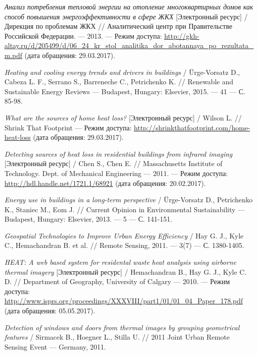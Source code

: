 \begin{thebibliography}{00}
	\emph{Анализ потребления тепловой энергии на отопление многоквартирных домов как способ повышения энергоэффективности в сфере ЖКХ} [Электронный ресурс] / Дирекция по проблемам ЖКХ //
	Аналитический центр при Правительстве Российской Федерации. --- 2013. --- Режим доступа:
	\url{http://gkh-altay.ru/d/205499/d/06_24_kr_stol_analitika_dor_abotannaya_po_rezultata_m.pdf} (дата обращения: 29.03.2017).

	\emph{Heating and cooling energy trends and drivers in buildings} / Ürge-Vorsatz D., Cabeza L. F., Serrano S., Barreneche C., Petrichenko K. //
	Renewable and Sustainable Energy Reviews --- Budapest, Hungary: Elsevier, 2015. --- \No{} 41 --- С. 85-98.

	\emph{What are the sources of home heat loss?} [Электронный ресурс] / Wilson L. //
	Shrink That Footprint --- Режим доступа: \url{http://shrinkthatfootprint.com/home-heat-loss} (дата обращения: 29.03.2017).

	\emph{Detecting sources of heat loss in residential buildings from infrared imaging} [Электронный ресурс] / Chen S., Chen E. //
	Massachusetts Institute of Technology. Dept. of Mechanical Engineering --- 2011. --- Режим доступа: \url{http://hdl.handle.net/1721.1/68921} (дата обращения: 20.02.2017).

	\emph{Energy use in buildings in a long-term perspective} / Ürge-Vorsatz D., Petrichenko K., Staniec M., Eom J. //
	Current Opinion in Environmental Sustainability --- Budapest, Hungary: Elsevier, 2013. --- \No{} 5 --- С. 141-151.

	\emph{Geospatial Technologies to Improve Urban Energy Efficiency} / Hay G. J., Kyle C., Hemachandran B. et al. // Remote Sensing, 2011. --- \No{} 3(7) --- С. 1380-1405.

	\emph{HEAT: A web based system for residental waste heat analysis using airborne thermal imagery} [Электронный ресурс] / Hemachandran B., Hay G. J., Kyle C. D. // Department of Geography, University of Calgary --- 2010. --- Режим доступа: \url{http://www.isprs.org/proceedings/XXXVIII/part1/01/01_04_Paper_178.pdf} (дата обращения: 05.05.2017).

	\emph{Detection of windows and doors from thermal images by grouping geometrical features} / Sirmacek B., Hoegner L., Stilla U. //
	2011 Joint Urban Remote Sensing Event --- Germany, 2011.


\end{thebibliography}
